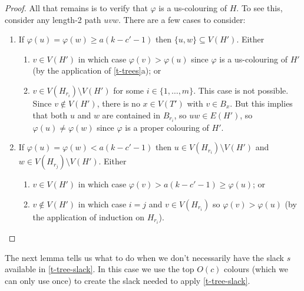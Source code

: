 \documentclass[kpfonts]{patmorin}
\theoremstyle{named}
\newcommand{\weirdref}[2]{\cref{#1}#2}
\begin{document}
\begin{proof}
   All that remains is to verify that $\varphi$ is a us-colouring of $H$. To see this, consider any length-2 path $uvw$.  There are a few cases to consider:
   \begin{enumerate}
    \item If $\varphi(u)=\varphi(w) \ge a(k-c'-1)$ then $\{u,w\}\subseteq V(H')$. Either
    \begin{enumerate}
       \item $v\in V(H')$ in which case $\varphi(v)>\varphi(u)$ since $\varphi$ is a us-colouring of $H'$ (by the application of \weirdref{t-trees}{a}); or
       \item $v\in V(H_{r_i})\setminus V(H')$ for some $i\in\{1,\ldots,m\}$.  This case is not possible.  Since $v\not\in V(H')$, there is no $x\in V(T')$ with $v\in B_x$.  But this implies that both $u$ and $w$ are contained in $B_{r_i}$, so $uw\in E(H')$, so $\varphi(u)\neq\varphi(w)$ since $\varphi$ is a proper colouring of $H'$.
   \end{enumerate}
   \item If $\varphi(u)=\varphi(w) < a(k-c'-1)$ then $u\in V(H_{r_i})\setminus V(H')$ and $w\in V(H_{r_j})\setminus V(H')$.  Either
   \begin{enumerate}
    \item $v\in V(H')$ in which case $\varphi(v)>a(k-c'-1)\ge\varphi(u)$; or
    \item $v\not\in V(H')$ in which case $i=j$ and $v\in V(H_{r_i})$ so $\varphi(v)>\varphi(u)$ (by the application of induction on $H_{r_i}$). \qedhere
    \end{enumerate}
   \end{enumerate}
\end{proof}

The next lemma tells us what to do when we don't necessarily have the slack $s$ available in \cref{t-tree-slack}.  In this case we use the top $O(c)$ colours (which we can only use once) to create the slack needed to apply \cref{t-tree-slack}.
\end{document}
